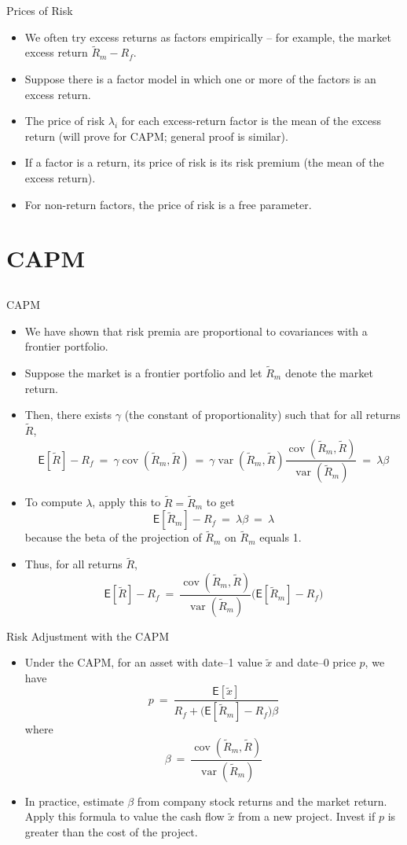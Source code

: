 \documentclass[10pt]{beamer}
\DeclareMathOperator{\var}{var}
\DeclareMathOperator{\cov}{cov}
\newcommand{\bi}{\begin{itemize}}
\newcommand{\ei}{\end{itemize}}
\newcommand{\im}{\item}
\newcommand{\mye}{\ensuremath{\mathsf{E}}}
\newcommand{\tx}{\tilde{x}}
\newcommand{\tr}{\widetilde{R}}
\begin{document}
\begin{frame}{Prices of Risk}
    \bi 
    \im We often try excess returns as factors empirically -- for example, the market excess return $\tr_m - R_f$.  
    \im Suppose there is a factor model in which one or more of the factors is an excess return.

    \im The price of risk $\lambda_i$ for each excess-return factor is the mean of the excess return (will prove for CAPM; general proof is similar).

    \im If a factor is a return, its price of risk is its risk premium (the mean of the excess return).

    \im For non-return factors, the price of risk is a free parameter.
\ei 
\end{frame}


\section{CAPM}\subsection{}

\begin{frame}{CAPM}
    \bi 
\im We have shown that risk premia are proportional to covariances with a frontier portfolio.  
\im Suppose the market is a frontier portfolio and let $\tr_m$ denote the market return.  

\im Then, there exists $\gamma$ (the constant of proportionality) such that for all returns $\tr$,
$$\mye[\tr] - R_f \ = \ \gamma \cov(\tr_m,\tr) \ = \ \gamma \var(\tr_m,\tr)\frac{\cov(\tr_m,\tr)}{\var(\tr_m)} \ = \ \lambda \beta$$
\im To compute $\lambda$, apply this to $\tr=\tr_m$ to get
$$\mye[\tr_m]-R_f \ = \ \lambda \beta \ = \ \lambda$$
because the beta of the projection of $\tr_m$ on $\tr_m$ equals 1.  
\im Thus, for all returns $\tr$,
$$\mye[\tr] - R_f \ = \ \frac{\cov(\tr_m,\tr)}{\var(\tr_m)}\big(\mye[\tr_m] - R_f \big)$$ 
\ei 
\end{frame}

\begin{frame}{Risk Adjustment with the CAPM}
    \bi 
\im Under the CAPM, for an asset with date--1 value $\tx$ and date--0 price $p$, we have
$$p \ = \ \frac{\mye[\tx]}{R_f + \big(\mye[\tr_m] - R_f \big)\beta}$$
where
$$\beta \ = \ \frac{\cov(\tr_m,\tr)}{\var(\tr_m)}$$
\im In practice, estimate $\beta$ from company stock returns and the market return.  Apply this formula to value the cash flow $\tx$ from a new project. Invest if $p$ is greater than the cost of the project.
\ei 
\end{frame}
\end{document}
